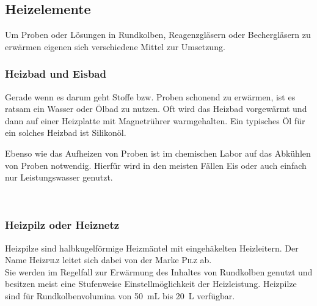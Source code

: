 \subsection{Heizelemente}
Um Proben oder Lösungen in Rundkolben, Reagenzgläsern oder Bechergläsern zu erwärmen eigenen sich verschiedene Mittel zur Umsetzung.



\subsubsection*{Heizbad und Eisbad}
Gerade wenn es darum geht Stoffe bzw. Proben schonend zu erwärmen, ist es ratsam ein Wasser oder Ölbad zu nutzen. Oft wird das Heizbad vorgewärmt und dann auf einer Heizplatte mit Magnetrührer warmgehalten. Ein typisches Öl für ein solches Heizbad ist Silikonöl.\\


Ebenso wie das Aufheizen von Proben ist im chemischen Labor auf das Abkühlen von Proben notwendig. Hierfür wird in den meisten Fällen Eis oder auch einfach nur Leistungswasser genutzt.

\\

\newpage

\subsubsection*{Heizpilz oder Heiznetz}
Heizpilze sind halbkugelförmige Heizmäntel mit eingehäkelten Heizleitern. Der Name Heiz\textsc{pilz} leitet sich dabei von der Marke \textsc{Pilz} ab.\\
Sie werden im Regelfall zur Erwärmung des Inhaltes von Rundkolben genutzt und besitzen meist eine Stufenweise Einstellmöglichkeit der Heizleistung. Heizpilze sind für Rundkolbenvolumina von \SI{50}{\milli \liter} bis \SI{20}{\liter} verfügbar.\\

